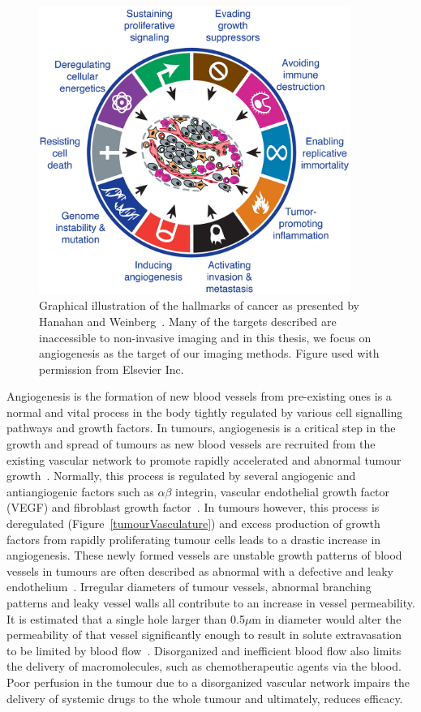 \begin{figure}[htbp]   
 \begin{center}  
 \includegraphics[width=4in]{intro/./intro-images/cancerHallmarks.png}
 \caption{Graphical illustration of the hallmarks of cancer as presented by Hanahan and Weinberg~\cite{Hanahan:2011gu}. Many of the targets described are inaccessible to non-invasive imaging and in this thesis, we focus on angiogenesis as the target of our imaging methods. Figure used with permission from Elsevier Inc.}  
 \label{cancerHallmarks}  
 \end{center}
\end{figure}

Angiogenesis is the formation of new blood vessels from pre-existing ones is a normal and vital process in the body tightly regulated by various cell signalling pathways and growth factors.
In tumours, angiogenesis is a critical step in the growth and spread of tumours as new blood vessels are recruited from the existing vascular network to promote rapidly accelerated and abnormal tumour growth~\cite{Folkman:1990ud}.
Normally, this process is regulated by several angiogenic and antiangiogenic factors such as $\alpha \beta$ integrin, vascular endothelial growth factor (\acs{VEGF}) and fibroblast growth factor~\cite{Laking:2006ij}.
In tumours however, this process is deregulated (Figure~\ref{tumourVasculature}) and excess production of growth factors from rapidly proliferating tumour cells leads to a drastic increase in angiogenesis.
These newly formed vessels are unstable growth patterns of blood vessels in tumours are often described as abnormal with a defective and leaky endothelium~\cite{McDonald:2002ut}.
Irregular diameters of tumour vessels, abnormal branching patterns and leaky vessel walls all contribute to an increase in vessel permeability.
It is estimated that a single hole larger than 0.5$\mu$m in diameter would alter the permeability of that vessel significantly enough to result in solute extravasation to be limited by blood flow~\cite{McDonald:2002ut}.
Disorganized and inefficient blood flow also limits the delivery of macromolecules, such as chemotherapeutic agents via the blood.
Poor perfusion in the tumour due to a disorganized vascular network impairs the delivery of systemic drugs to the whole tumour and ultimately, reduces efficacy.

